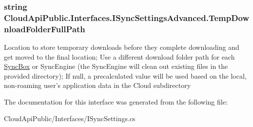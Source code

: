 \hypertarget{interface_cloud_api_public_1_1_interfaces_1_1_i_sync_settings_advanced_ad7bd9a4765d6090a05a97222c8cfd222}{
\subsubsection[{Temp\-Download\-Folder\-Full\-Path}]{\setlength{\rightskip}{0pt plus 5cm}string Cloud\-Api\-Public.\-Interfaces.\-I\-Sync\-Settings\-Advanced.\-Temp\-Download\-Folder\-Full\-Path\hspace{0.3cm}{\ttfamily [get]}}}\label{interface_cloud_api_public_1_1_interfaces_1_1_i_sync_settings_advanced_ad7bd9a4765d6090a05a97222c8cfd222}


Location to store temporary downloads before they complete downloading and get moved to the final location; Use a different download folder path for each \hyperlink{class_cloud_api_public_1_1_sync_box}{Sync\-Box} or Sync\-Engine (the Sync\-Engine will clean out existing files in the provided directory); If null, a precalculated value will be used based on the local, non-\/roaming user's application data in the Cloud subdirectory 



The documentation for this interface was generated from the following file\-:\begin{DoxyCompactItemize}
\item 
Cloud\-Api\-Public/\-Interfaces/I\-Sync\-Settings.\-cs\end{DoxyCompactItemize}

